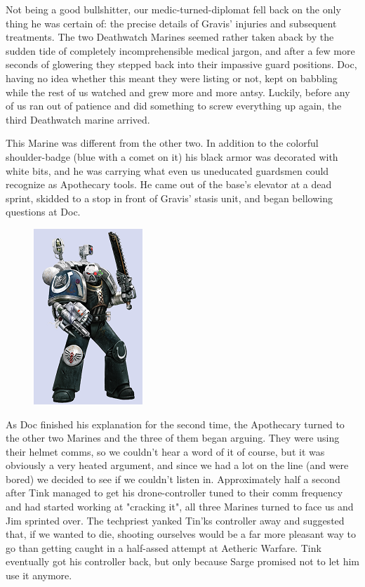 Not being a good bullshitter, our medic-turned-diplomat fell back on the only thing he was certain of: 
the precise details of Gravis' injuries and subsequent treatments. 
The two Deathwatch Marines seemed rather taken aback by the sudden tide of completely incomprehensible medical jargon, and after a few more seconds of glowering they stepped back into their impassive guard positions. 
Doc, having no idea whether this meant they were listing or not, kept on babbling while the rest of us watched and grew more and more antsy. 
Luckily, before any of us ran out of patience and did something to screw everything up again, the third Deathwatch marine arrived.

This Marine was different from the other two. 
In addition to the colorful shoulder-badge (blue with a comet on it) his black armor was decorated with white bits, and he was carrying what even us uneducated guardsmen could recognize as Apothecary tools. 
He came out of the base's elevator at a dead sprint, skidded to a stop in front of Gravis' stasis unit, and began bellowing questions at Doc.

\begin{figure}
	\begin{center}
		\includegraphics[width=\figwidth]{pics/16/12.png}
	\end{center}
\end{figure}
As Doc finished his explanation for the second time, the Apothecary turned to the other two Marines and the three of them began arguing. 
They were using their helmet comms, so we couldn't hear a word of it of course, but it was obviously a very heated argument, and since we had a lot on the line (and were bored) we decided to see if we couldn't listen in. 
Approximately half a second after Tink managed to get his drone-controller tuned to their comm frequency and had started working at "cracking it", all three Marines turned to face us and Jim sprinted over. 
The techpriest yanked Tin'ks controller away and suggested that, if we wanted to die, shooting ourselves would be a far more pleasant way to go than getting caught in a half-assed attempt at Aetheric Warfare. 
Tink eventually got his controller back, but only because Sarge promised not to let him use it anymore.

